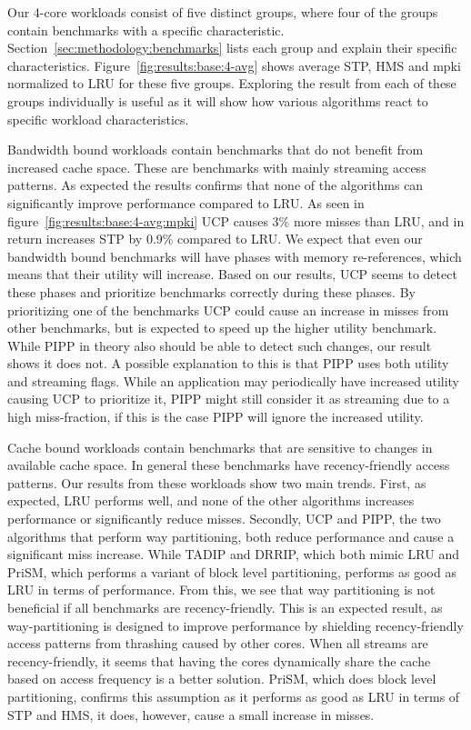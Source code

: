 Our 4-core workloads consist of five distinct groups, where four of the groups contain benchmarks with a specific characteristic.
Section~\ref{sec:methodology:benchmarks} lists each group and explain their specific characteristics.
Figure~\ref{fig:results:base:4-avg} shows average STP, HMS and mpki normalized to LRU for these five groups.
Exploring the result from each of these groups individually is useful as it will show how various algorithms react to specific workload characteristics.

Bandwidth bound workloads contain benchmarks that do not benefit from increased cache space.
These are benchmarks with mainly streaming access patterns. 
As expected the results confirms that none of the algorithms can significantly improve performance compared to LRU.
As seen in figure~\ref{fig:results:base:4-avg:mpki} UCP causes 3\% more misses than LRU, and in return increases STP by 0.9\% compared to LRU.
We expect that even our bandwidth bound benchmarks will have phases with memory re-references, which means that their utility will increase.
Based on our results, UCP seems to detect these phases and prioritize benchmarks correctly during these phases.
By prioritizing one of the benchmarks UCP could cause an increase in misses from other benchmarks, but is expected to speed up the higher utility benchmark.
While PIPP in theory also should be able to detect such changes, our result shows it does not.
A possible explanation to this is that PIPP uses both utility and streaming flags.
While an application may periodically have increased utility causing UCP to prioritize it, PIPP might still consider it as streaming due to a high miss-fraction, if this is the case PIPP will ignore the increased utility.

Cache bound workloads contain benchmarks that are sensitive to changes in available cache space.
In general these benchmarks have recency-friendly access patterns.
Our results from these workloads show two main trends.
First, as expected, LRU performs well, and none of the other algorithms increases performance or significantly reduce misses.
Secondly, UCP and PIPP, the two algorithms that perform way partitioning, both reduce performance and cause a significant miss increase. 
While TADIP and DRRIP, which both mimic LRU and PriSM, which performs a variant of block level partitioning, performs as good as LRU in terms of performance.
From this, we see that way partitioning is not beneficial if all benchmarks are recency-friendly.
This is an expected result, as way-partitioning is designed to improve performance by shielding recency-friendly access patterns from thrashing caused by other cores.
When all streams are recency-friendly, it seems that having the cores dynamically share the cache based on access frequency is a better solution.
PriSM, which does block level partitioning, confirms this assumption as it performs as good as LRU in terms of STP and HMS, it does, however, cause a small increase in misses.

